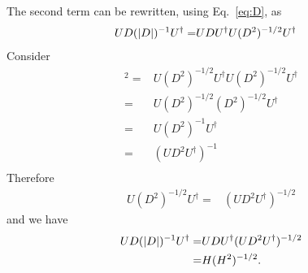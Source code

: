 \documentclass[twocolumn,amsmath,longbibliography,amssymb,superscriptaddress]{revtex4-1}
\begin{document}
The second term can be rewritten, using Eq.~\ref{eq:D}, as
\begin{align}\label{eq:C_rewritten}
UD(\abs{D})^{-1}U^\dagger =& UDU^\dagger U(D^2)^{-1/2}U^\dagger
\end{align}
Consider
\begin{align*}
[U (D^2)^{-1/2} U^\dagger]^2 =& U (D^2)^{-1/2} U^\dagger U  (D^2)^{-1/2} U^\dagger \\
=&  U (D^2)^{-1/2}  (D^2)^{-1/2} U^\dagger \\
=&  U (D^2)^{-1} U^\dagger \\
=&  (U D^2 U^\dagger)^{-1} \\
\end{align*}
Therefore
\begin{align*}
U (D^2)^{-1/2} U^\dagger =&(U D^2 U^\dagger)^{-1/2} 
\end{align*}
and we have
\begin{align}\label{eq:C_rewritten}
UD(\abs{D})^{-1}U^\dagger =& UDU^\dagger(U D^2 U^\dagger)^{-1/2} \\ 
=& H(H^2)^{-1/2}.
\end{align}
\end{document}

